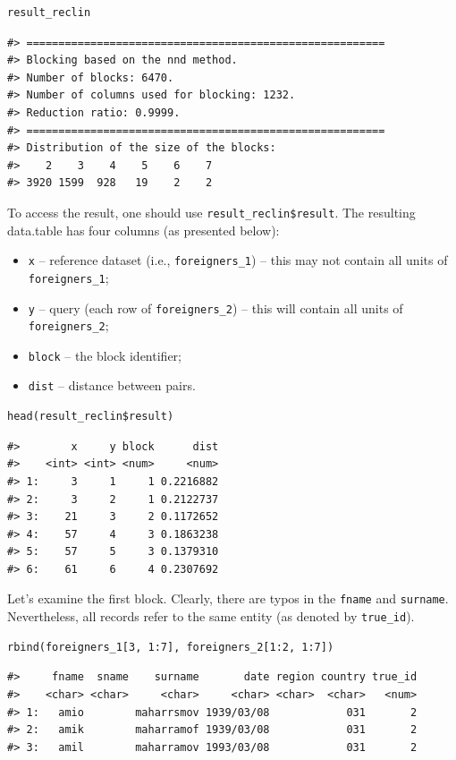 \begin{verbatim}
result_reclin
\end{verbatim}

\begin{verbatim}
#> ========================================================
#> Blocking based on the nnd method.
#> Number of blocks: 6470.
#> Number of columns used for blocking: 1232.
#> Reduction ratio: 0.9999.
#> ========================================================
#> Distribution of the size of the blocks:
#>    2    3    4    5    6    7 
#> 3920 1599  928   19    2    2
\end{verbatim}

To access the result, one should use \texttt{result\_reclin\$result}. The
resulting data.table has four columns (as presented below):

\begin{itemize}
\tightlist
\item
  \texttt{x} -- reference dataset (i.e., \texttt{foreigners\_1}) -- this may not
  contain all units of \texttt{foreigners\_1};
\item
  \texttt{y} -- query (each row of \texttt{foreigners\_2}) -- this will contain all
  units of \texttt{foreigners\_2};
\item
  \texttt{block} -- the block identifier;
\item
  \texttt{dist} -- distance between pairs.
\end{itemize}

\begin{verbatim}
head(result_reclin$result)
\end{verbatim}

\begin{verbatim}
#>        x     y block      dist
#>    <int> <int> <num>     <num>
#> 1:     3     1     1 0.2216882
#> 2:     3     2     1 0.2122737
#> 3:    21     3     2 0.1172652
#> 4:    57     4     3 0.1863238
#> 5:    57     5     3 0.1379310
#> 6:    61     6     4 0.2307692
\end{verbatim}

Let's examine the first block. Clearly, there are typos in the \texttt{fname}
and \texttt{surname}. Nevertheless, all records refer to the same entity (as
denoted by \texttt{true\_id}).

\begin{verbatim}
rbind(foreigners_1[3, 1:7], foreigners_2[1:2, 1:7])
\end{verbatim}

\begin{verbatim}
#>     fname  sname    surname       date region country true_id
#>    <char> <char>     <char>     <char> <char>  <char>   <num>
#> 1:   amio        maharrsmov 1939/03/08            031       2
#> 2:   amik        maharramof 1939/03/08            031       2
#> 3:   amil        maharramov 1993/03/08            031       2
\end{verbatim}

